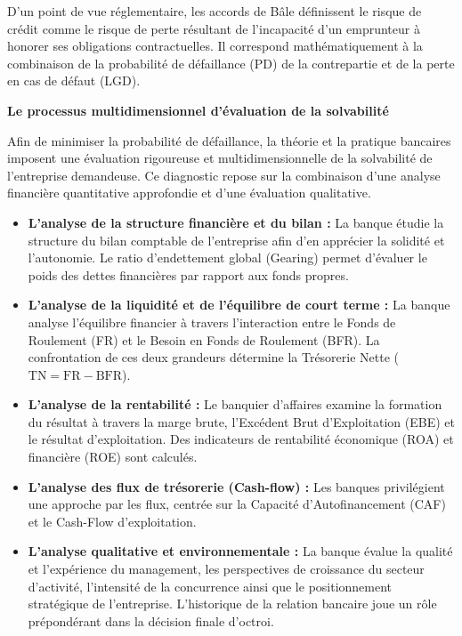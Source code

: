 \documentclass[12pt,a4paper]{report}
\begin{document}
D'un point de vue réglementaire, les accords de Bâle définissent le risque de crédit comme le risque de perte résultant de l'incapacité d'un emprunteur à honorer ses obligations contractuelles. Il correspond mathématiquement à la combinaison de la probabilité de défaillance (PD) de la contrepartie et de la perte en cas de défaut (LGD).

\medskip\textbf{Le processus multidimensionnel d'évaluation de la solvabilité}

Afin de minimiser la probabilité de défaillance, la théorie et la pratique bancaires imposent une évaluation rigoureuse et multidimensionnelle de la solvabilité de l'entreprise demandeuse. Ce diagnostic repose sur la combinaison d'une analyse financière quantitative approfondie et d'une évaluation qualitative.

\begin{itemize}
  \item \textbf{L'analyse de la structure financière et du bilan :} La banque étudie la structure du bilan comptable de l'entreprise afin d'en apprécier la solidité et l'autonomie. Le ratio d'endettement global (Gearing) permet d'évaluer le poids des dettes financières par rapport aux fonds propres.

  \item \textbf{L'analyse de la liquidité et de l'équilibre de court terme :} La banque analyse l'équilibre financier à travers l'interaction entre le Fonds de Roulement (FR) et le Besoin en Fonds de Roulement (BFR). La confrontation de ces deux grandeurs détermine la Trésorerie Nette (\(\text{TN} = \text{FR} - \text{BFR}\)).

  \item \textbf{L'analyse de la rentabilité :} Le banquier d'affaires examine la formation du résultat à travers la marge brute, l'Excédent Brut d'Exploitation (EBE) et le résultat d'exploitation. Des indicateurs de rentabilité économique (ROA) et financière (ROE) sont calculés.

  \item \textbf{L'analyse des flux de trésorerie (Cash-flow) :} Les banques privilégient une approche par les flux, centrée sur la Capacité d'Autofinancement (CAF) et le Cash-Flow d'exploitation.

  \item \textbf{L'analyse qualitative et environnementale :} La banque évalue la qualité et l'expérience du management, les perspectives de croissance du secteur d'activité, l'intensité de la concurrence ainsi que le positionnement stratégique de l'entreprise. L'historique de la relation bancaire joue un rôle prépondérant dans la décision finale d'octroi.
\end{itemize}
\end{document}
